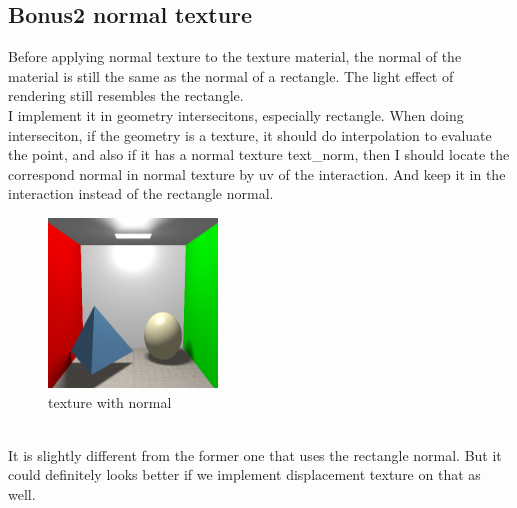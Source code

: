 \documentclass[acmtog]{acmart}
\begin{document}
\subsection{Bonus2 normal texture}
Before applying normal texture to the texture material, the normal of the material is still the same as the normal of a rectangle. The light effect of rendering still resembles the rectangle.\\
I implement it in geometry intersecitons, especially rectangle. When doing interseciton, if the geometry is a texture, it should do interpolation to evaluate the point, and also if it has a normal texture text\_norm, then I should locate the correspond normal in normal texture by uv of the interaction. And keep it in the interaction instead of the rectangle normal.
\begin{figure}[h]
	\includegraphics[width=4.5cm,height=4.5cm]{texture.png}
	\caption{texture with normal}
\end{figure}\\
It is slightly different from the former one that uses the rectangle normal. But it could definitely looks better if we implement displacement texture on that as well.
\end{document}
